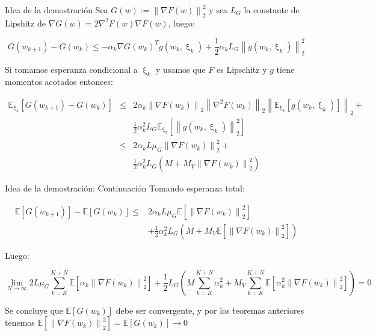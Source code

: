\documentclass{beamer}
\newcommand{\norm}[1]{\left\lVert#1\right\rVert}
\newcommand{\expectation}[1]{\mathbb{E} \left[#1\right]}
\newcommand{\expectationsub}[2]{\mathbb{E}_{#1} \left[#2\right]}
\newcommand{\expectationchik}[1]{\expectationsub{\upxi_{k}}{#1}}
\begin{document}
\begin{frame}{Idea de la demostraci\'on}
Sea $G(w) := \norm{\nabla F(w)}_2^2$ y sea $L_G$ la constante de Lipshitz de $\nabla G(w) = 2 \nabla^2 F(w) \nabla F(w)$, luego:

\begin{equation*}
G(w_{k+1}) - G(w_k) \leq  - \alpha_k \nabla G(w_k)^T g(w_k, \upxi_{k}) + \frac{1}{2} \alpha_k L_G  \norm{g(w_k, \upxi_{k})}_2^2
\end{equation*}

Si tomamos esperanza condicional a $\upxi_{k}$ y usamos que $F$ es Lipschitz y $g$ tiene momentos acotados entonces:

\begin{footnotesize}
\begin{equation*}
\begin{aligned}
\expectationchik{G(w_{k+1}) - G(w_k)} & \leq &   2 \alpha_k \norm{\nabla F(w_k)}_2 \norm{\nabla^2 F(w_k)}_2 \norm{\expectationchik{g(w_k, \upxi_{k})}}_2 +  \\
&& \frac{1}{2} \alpha_k^2 L_G \expectationchik{\norm{g(w_k, \upxi_{k})}^2_2} \\
& \leq & 2 \alpha_k L \mu_G \norm{\nabla F (w_k)}_2^2 + \\
&& \frac{1}{2} \alpha_k^2 L_G\left(M + M_V \norm{\nabla F(w_k)}_2^2\right)
\end{aligned}
\end{equation*}
\end{footnotesize}

\end{frame}
\begin{frame}{Idea de la demostraci\'on: Continuaci\'on}
Tomando esperanza total:

\begin{footnotesize}
\begin{equation*}
\begin{aligned}
\expectation{G(w_{k+1})} - \expectation{G(w_k)} \leq & 2 \alpha_k L \mu_G \expectation{\norm{\nabla F (w_k)}_2^2} \\  & + \frac{1}{2} \alpha_k^2 L_G\left(M + M_V \expectation{\norm{\nabla F(w_k)}_2^2}\right)
\end{aligned}
\end{equation*}
\end{footnotesize}
	
Luego:

\begin{footnotesize}
\begin{equation*}
\lim\limits_{N \rightarrow \infty} { {2 L \mu_G \sum\limits_{k=K}^{K+N}\expectation{\alpha_k\norm{\nabla F (w_k)}_2^2}+  \frac{1}{2} L_G\left(M\sum\limits_{k=K}^{K+N}\alpha_k^2 + M_V \sum\limits_{k=K}^{K+N}\expectation{\alpha_k^2\norm{\nabla F(w_k)}_2^2}\right)} } = 0
\end{equation*}
\end{footnotesize}

Se concluye que $\expectation{G(w_k)}$ debe ser convergente, y por los teoremas anteriores tenemos $\expectation{\norm{\nabla F(w_k)}_2^2} = \expectation{G(w_k)} \rightarrow 0$

\end{frame}
\end{document}
